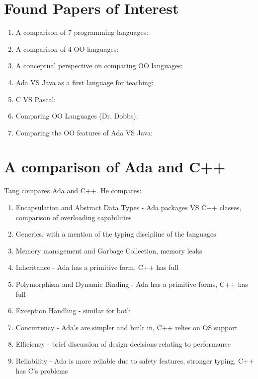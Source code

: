 \documentclass{article}
\begin{document}
\section{Found Papers of Interest}

\begin{enumerate}
    \item A comparison of 7 programming languages: \cite{Prechelt7LangComp}

\item A comparison of 4 OO languages: \cite{Henderson4OOLangComp}

\item A conceptual perspective on comparing OO languages: \cite{KristensenPerspCompOOLangs}

\item Ada VS Java as a first language for teaching: \cite{BrosgolAdaVsJavaTeaching}

\item C VS Pascal: \cite{FeuerCVsPascal}

\item Comparing OO Languages (Dr. Dobbs): \cite{DDJFloydeCompOOLangs}

\item Comparing the OO features of Ada VS Java: \cite{BrosgolCompOOAdaVsJava}

\end{enumerate}

\section{A comparison of Ada and C++}
Tang compares Ada and C++\cite{TangAdaVsCpp}.  He compares:

\begin{enumerate}
    \item Encapsulation and Abstract Data Types - Ada packages VS C++ classes, comparison of overloading capabilities
    \item Generics, with a mention of the typing discipline of the languages
    \item Memory management and Garbage Collection, memory leaks
    \item Inheritance - Ada has a primitive form, C++ has full
    \item Polymorphism and Dynamic Binding - Ada has a primitive forms, C++ has full
    \item Exception Handling - similar for both
    \item Concurrency - Ada's are simpler and built in, C++ relies on OS support
    \item Efficiency - brief discussion of design decisions relating to performance
    \item Reliability - Ada is more reliable due to safety features, stronger typing, C++ has C's problems
\end{enumerate}
\end{document}
